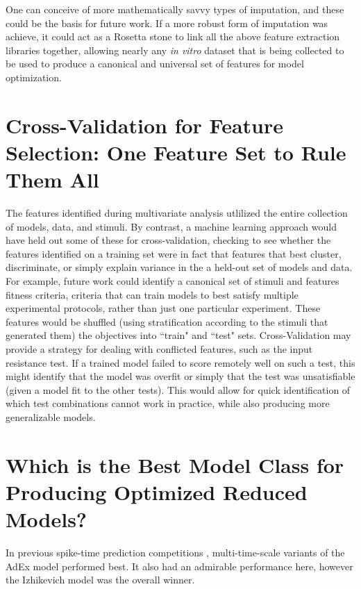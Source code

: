 One can conceive of more mathematically savvy types of imputation, and these could be the basis for future work.
If a more robust form of imputation was achieve, it could act as a Rosetta stone to link all the above feature extraction libraries together, allowing nearly any \emph{in vitro} dataset that is being collected to be used to produce a canonical and universal set of features for model optimization.


\section{Cross-Validation for Feature Selection: One Feature Set to Rule Them All}
The features identified during multivariate analysis utlilized the entire collection of models, data, and stimuli.
By contrast, a machine learning approach would have held out some of these for cross-validation, checking to see whether the features identified on a training set were in fact that features that best cluster, discriminate, or simply explain variance in the a held-out set of models and data.
For example, future work could identify a canonical set of stimuli and features fitness criteria, criteria that can train models to best satisfy multiple experimental protocols, rather than just one particular experiment.
These features would be shuffled (using stratification according to the stimuli that generated them) the objectives into ``train" and ``test" sets.
Cross-Validation may provide a strategy for dealing with conflicted features, such as the input resistance test.
If a trained model failed to score remotely well on such a test, this might identify that the model was overfit or simply that the test was unsatisfiable (given a model fit to the other tests).
This would allow for quick identification of which test combinations cannot work in practice, while also producing more generalizable models.

\section{Which is the Best Model Class for Producing Optimized Reduced Models?}
In previous spike-time prediction competitions \citep{incf_multi}, multi-time-scale variants of the AdEx model performed best.
It also had an admirable performance here, however the Izhikevich model was the overall winner.

